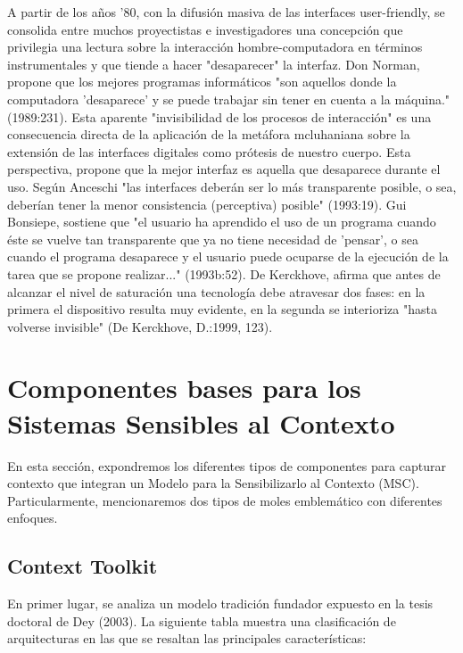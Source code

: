 A partir de los años ’80, con la difusión masiva de las interfaces
user-friendly, se
consolida entre muchos proyectistas e investigadores una concepción que
privilegia una
lectura sobre la interacción hombre-computadora en términos instrumentales y que
tiende a hacer "desaparecer" la interfaz. Don Norman, propone que los mejores
programas informáticos "son aquellos donde la computadora 'desaparece’ y se
puede
trabajar sin tener en cuenta a la máquina." (1989:231). Esta aparente
"invisibilidad de
los procesos de interacción" es una consecuencia directa de la aplicación de la
metáfora
mcluhaniana sobre la extensión de las interfaces digitales como prótesis de
nuestro
cuerpo. Esta perspectiva, propone que la mejor interfaz es aquella que
desaparece
durante el uso. Según Anceschi "las interfaces deberán ser lo más transparente
posible,
o sea, deberían tener la menor consistencia (perceptiva) posible" (1993:19). Gui
Bonsiepe, sostiene que "el usuario ha aprendido el uso de un programa cuando
éste se
vuelve tan transparente que ya no tiene necesidad de 'pensar’, o sea cuando el
programa desaparece y el usuario puede ocuparse de la ejecución de la tarea que
se
propone realizar..." (1993b:52). De Kerckhove, afirma que antes de alcanzar el
nivel de
saturación una tecnología debe atravesar dos fases: en la primera el dispositivo
resulta
muy evidente, en la segunda se interioriza "hasta volverse invisible" (De
Kerckhove, D.:1999, 123).



\section{Componentes bases para los Sistemas Sensibles al Contexto}\label{requisitoDHD}
  
En esta sección, expondremos los diferentes tipos de componentes para capturar
contexto que integran un Modelo para la Sensibilizarlo al Contexto (MSC).
Particularmente, mencionaremos dos tipos de moles emblemático con diferentes
enfoques.

\subsection{Context Toolkit}


En primer lugar, se analiza un modelo tradición fundador expuesto en la tesis
doctoral de Dey (2003)\cite{dey}. La siguiente tabla muestra una clasificación
de arquitecturas en las que se resaltan las principales características:


